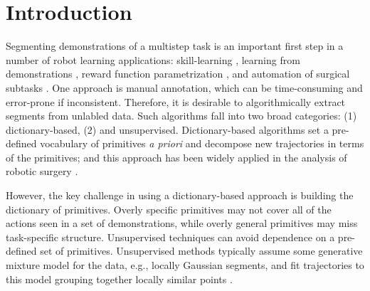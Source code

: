 \section{Introduction}
Segmenting demonstrations of a multistep task is an important first step in a number of robot learning applications: skill-learning \cite{calinon2010learning, kruger2010learning, konidaris2011robot}, learning from demonstrations \cite{Niekum2015learning}, reward function parametrization \cite{hanlearning}, and automation of surgical subtasks \cite{murali2015learning}.
One approach  is manual annotation, which can be time-consuming and error-prone if inconsistent.
Therefore, it is desirable to algorithmically extract segments from unlabled data.
Such algorithms fall into two broad categories: (1) dictionary-based, (2) and unsupervised.
Dictionary-based algorithms set a pre-defined vocabulary of primitives \emph{a priori} and decompose new trajectories in terms of the primitives; and this approach has been widely applied in the analysis of robotic surgery \cite{lea15improved,zappella2013surgical}.

However, the key challenge in using a dictionary-based approach is building the dictionary of primitives. 
Overly specific primitives may not cover all of the actions seen in a set of demonstrations, while overly  general primitives may miss task-specific structure.
Unsupervised techniques can avoid dependence on a pre-defined set of primitives.
Unsupervised methods typically assume some generative mixture model for the data, e.g., locally Gaussian segments, and fit trajectories to this model grouping together locally similar points \cite{calinon2010learning, krishnan2015tsc, calinon2004stochastic, kruger2010learning, fox2009nonparametric, oh2005learning}.


